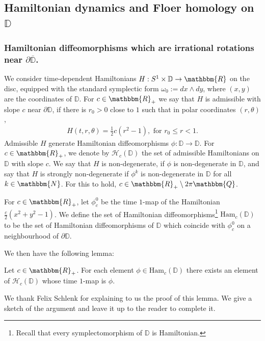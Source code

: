 \documentclass[AHL,Unicode,longabstracts,published]{cedram}
\newcommand{\N}{\mathbbm{N}}
\newcommand{\Q}{\mathbbm{Q}}
\newcommand{\R}{\mathbbm{R}}
\newcommand{\D}{\mathbb{D}}
\newcommand{\Ham}{\mathrm{Ham}}
\newcommand{\clH}{\mathcal{H}}
\begin{document}
\subsection{Hamiltonian dynamics and Floer homology on \texorpdfstring{$\D$}{D}} \label{sec:Hamsondisk}

\subsubsection{Hamiltonian diffeomorphisms which are irrational rotations near \texorpdfstring{$\partial \overline{\D}$}{partial D}.} \label{sec:hamrotnearbound}

We consider time-dependent Hamiltonians $H:S^1 \times \D \to \R$ on the disc, equipped with the standard symplectic form $\omega_0 := dx \wedge dy$, where $(x,y)$ are the coordinates of $\D$. For $c \in \R_{+}$ we say that $H$ is admissible with slope $c$ near $\partial \D$, if there is $r_0>0$ close to $1$ such that in polar coordinates $ (r,\theta)$,
\begin{align}\label{eqdefr0}
H(t,r,\theta) = \frac{1}{2}c(r^2-1), \text{ for } r_0 \leq r < 1.
\end{align}
Admissible $H$ generate Hamiltonian diffeomorphisms $\phi: \D \to \D$. For $c \in \R_+$, we denote by $\clH_c(\D)$ the set of admissible Hamiltonians on $\D$ with slope $c$. We say that $H$ is non-degenerate, if $\phi$ is non-degenerate in $\D$, and say that $H$ is strongly non-degenerate if $\phi^k$ is non-degenerate in $\D$ for all $k\in \N$. For this to hold, $c \in \R_+ \setminus 2\pi \Q$.

For $c \in \R_+ $, let $\phi^0_c$ be the time $1$-map of the Hamiltonian  $\frac{c}{2}(x^2 + y^2 -1)$. We define the set of Hamiltonian diffeomorphisms\footnote{Recall that every symplectomorphism of $\D$ is Hamiltonian.} $\Ham_c(\D)$ to be the set of Hamiltonian diffeomorphisms of $\D$ which coincide with $\phi^0_c$ on a neighbourhood of $\partial \D$.



We then have the following lemma:

\begin{lemm} \label{lem:felix}
Let $c \in \R_+$. For each element $\phi \in \Ham_c(\D)$ there exists an element of $\clH_c(\D)$ whose time $1$-map is $\phi$.
\end{lemm} 
We thank Felix Schlenk for explaining to us the proof of this lemma. We give a sketch of the argument and leave it up to the reader to complete it.
\end{document}

